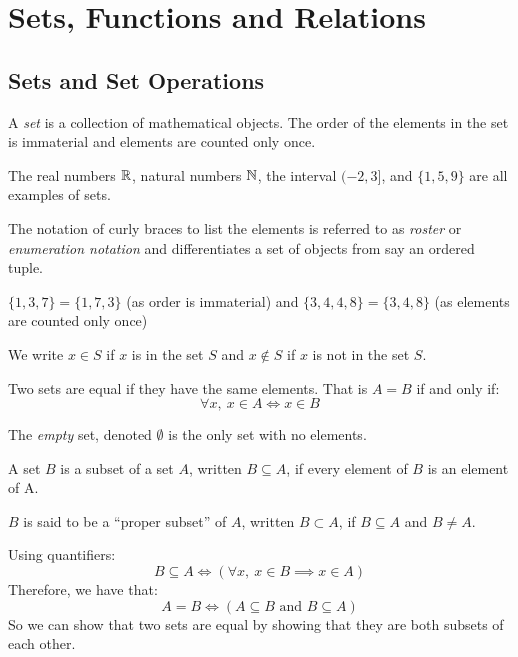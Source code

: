 \documentclass[../main.tex]{subfiles}
\begin{document}
\chapter{Sets, Functions and Relations}
\section{Sets and Set Operations}
\begin{definition}[Set]
  A \textit{set} is a collection of mathematical objects. The order of the elements in the set is immaterial and elements are counted only once.
\end{definition}
\begin{example}
  The real numbers $\mathbb{R}$, natural numbers $\mathbb{N}$, the interval $(-2, 3]$, and $\{1, 5, 9\}$ are all examples of sets.
\end{example}
\begin{remark}[Notation]
The notation of curly braces to list the elements is referred to as \textit{roster} or \textit{enumeration notation} and differentiates a set of objects from say an ordered tuple.
\end{remark}
\begin{example}
  $\{1, 3, 7\} = \{1, 7, 3\}$ (as order is immaterial) and $\{3, 4, 4, 8\} = \{3, 4, 8\}$ (as elements are counted only once)
\end{example}
\begin{remark}[Notation]
  We write $x \in S$ if $x$ is in the set $S$ and $x \notin S$ if $x$ is not in the set $S$.
\end{remark}
Two sets are equal if they have the same elements.
That is $A = B$ if and only if:
\[
  \forall x,\ x \in A \iff x \in B
\]
\begin{definition}
  The \textit{empty} set, denoted $\emptyset$ is the only set with no elements.
\end{definition}
\begin{definition}[Subset]
A set $B$ is a subset of a set $A$, written $B \subseteq A$, if every element of $B$ is an element of A.

$B$ is said to be a ``proper subset'' of $A$, written $B \subset A$, if $B \subseteq A$ and $B \neq A$.
\end{definition}
Using quantifiers:
\[
  B \subseteq A \iff (\forall x,\ x \in B \implies x \in A)
\]
Therefore, we have that:
\[
  A = B \iff (A \subseteq B \text{ and } B \subseteq A)
\]
So we can show that two sets are equal by showing that they are both subsets of each other.
\end{document}
